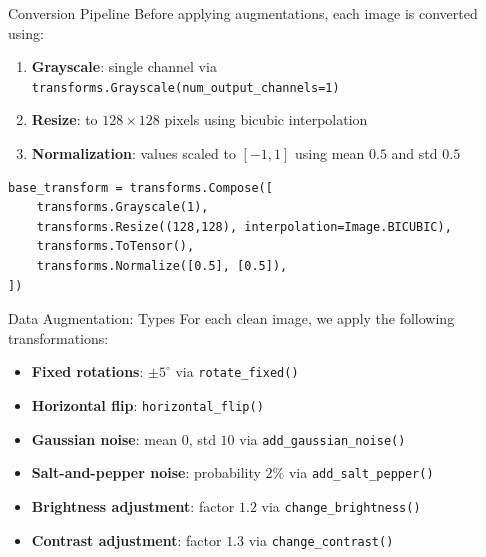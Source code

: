 \begin{frame}[fragile]{Conversion Pipeline}
  Before applying augmentations, each image is converted using:
  \begin{enumerate}
    \item \textbf{Grayscale}: single channel via \texttt{transforms.Grayscale(num\_output\_channels=1)}
    \item \textbf{Resize}: to $128\times128$ pixels using bicubic interpolation
    \item \textbf{Normalization}: values scaled to $[-1,1]$ using mean $0.5$ and std $0.5$
  \end{enumerate}
  \vspace{0.5em}
  \begin{verbatim}
base_transform = transforms.Compose([
    transforms.Grayscale(1),
    transforms.Resize((128,128), interpolation=Image.BICUBIC),
    transforms.ToTensor(),
    transforms.Normalize([0.5], [0.5]),
])
  \end{verbatim}
\end{frame}

\begin{frame}{Data Augmentation: Types}
  For each clean image, we apply the following transformations:
  \begin{itemize}
    \item \textbf{Fixed rotations}: $\pm5^\circ$ via \texttt{rotate\_fixed()}
    \item \textbf{Horizontal flip}: \texttt{horizontal\_flip()}
    \item \textbf{Gaussian noise}: mean $0$, std $10$ via \texttt{add\_gaussian\_noise()}
    \item \textbf{Salt-and-pepper noise}: probability $2\%$ via \texttt{add\_salt\_pepper()}
    \item \textbf{Brightness adjustment}: factor $1.2$ via \texttt{change\_brightness()}
    \item \textbf{Contrast adjustment}: factor $1.3$ via \texttt{change\_contrast()}
  \end{itemize}
\end{frame}
